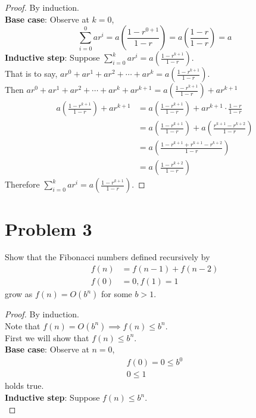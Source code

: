 \documentclass{article}
\begin{document}
\begin{proof}
    By induction. \\
    \textbf{Base case}: Observe at \(k = 0\),
    \begin{equation*}
        \sum_{i=0}^{0}{ar^i} = a \left( \frac{1-r^{0+1}}{1-r} \right) = a \left( \frac{1-r}{1-r} \right) = a
    \end{equation*}
    \textbf{Inductive step}: Suppose \(\sum_{i=0}^{k}{ar^i} = a \left( \frac{1-r^{k+1}}{1-r} \right)\). \\
    That is to say, \(ar^0 + ar^1 + ar^2 + \cdots + ar^k = a \left(\frac{1-r^{k+1}}{1-r}\right)\). \\
    Then \(ar^0 + ar^1 + ar^2 + \cdots + ar^k + ar^{k+1} = a \left(\frac{1-r^{k+1}}{1-r}\right) + ar^{k+1}\)
    \begin{align*}
        a \left(\frac{1-r^{k+1}}{1-r}\right) + ar^{k+1} & = a \left(\frac{1-r^{k+1}}{1-r}\right) + ar^{k+1} \cdot \frac{1-r}{1-r}             \\
                                                        & = a \left(\frac{1-r^{k+1}}{1-r}\right) + a \left(\frac{r^{k+1}-r^{k+2}}{1-r}\right) \\
                                                        & = a \left(\frac{1-r^{k+1}+r^{k+1}-r^{k+2}}{1-r}\right)                              \\
                                                        & = a \left(\frac{1-r^{k+2}}{1-r}\right)
    \end{align*}
    Therefore \(\sum_{i=0}^{k}{ar^i} = a \left( \frac{1-r^{k+1}}{1-r} \right)\).
\end{proof}

\pagebreak

\section*{Problem 3}
Show that the Fibonacci numbers defined recursively by
\begin{align*}
    f(n) & = f(n-1) + f(n-2) \\
    f(0) & = 0, f(1) = 1
\end{align*}
grow as \(f(n) = O(b^n)\) for some \(b > 1\).

\begin{proof}
    By induction. \\
    Note that \(f(n) = O(b^n) \implies f(n) \leq b^n\). \\
    First we will show that \(f(n) \leq b^n\). \\
    \textbf{Base case}: Observe at \(n = 0\),
    \begin{align*}
        f(0) = 0 \leq b^0 \\
        0 \leq 1
    \end{align*}
    holds true. \\
    \textbf{Inductive step}: Suppose \(f(n) \leq b^n\). \\
    
\end{proof}
\end{document}
